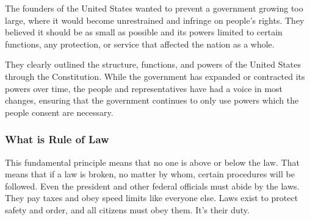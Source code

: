 The founders of the United States wanted to prevent a government growing too
large, where it would become unrestrained and infringe on people's rights. They
believed it should be as small as possible and its powers limited to certain
functions, any protection, or service that affected the nation as a whole.

They clearly outlined the structure, functions, and powers of the United States
through the Constitution. While the government has expanded or contracted its
powers over time, the people and representatives have had a voice in most
changes, ensuring that the government continues to only use powers which the
people consent are necessary.

\subsubsection*{What is Rule of Law}

This fundamental principle means that no one is above or below the law. That
means that if a law is broken, no matter by whom, certain procedures will be
followed. Even the president and other federal officials must abide by the
laws. They pay taxes and obey speed limits like everyone else. Laws exist to
protect safety and order, and all citizens must obey them. It's their duty.

\newpage
